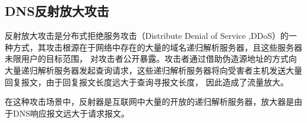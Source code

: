 \subsection{DNS反射放大攻击}

反射放大攻击是分布式拒绝服务攻击（Distribute Denial of Service ,DDoS）的一种方式，其攻击根源在于网络中存在的大量的域名递归解析服务器，且这些服务器未限用户的目标范围，
对攻击者公开暴露。攻击者通过借助伪造源地址的方式向大量递归解析服务器发起查询请求，这些递归解析服务器将向受害者主机发送大量回复报文，由于回复报文长度远大于查询寻报文长度，
因此造成了流量放大。

在这种攻击场景中，反射器是互联网中大量的开放的递归解析服务器，放大器是由于DNS响应报文远大于请求报文。


